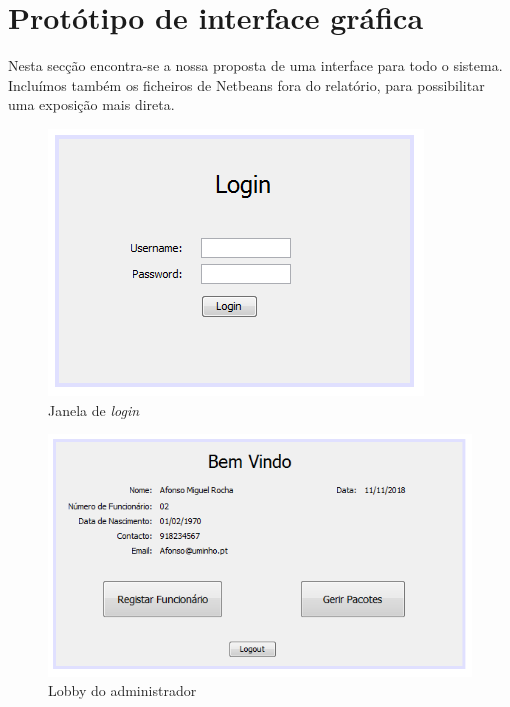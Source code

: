 \section{Protótipo de interface gráfica}

Nesta secção encontra-se a nossa proposta de uma interface para todo o sistema. Incluímos também os ficheiros de Netbeans fora do relatório, para possibilitar uma exposição mais direta.

\begin{figure}[h]
    \centering
    \includegraphics[width=\textwidth]{analise_de_requisitos/img/login.png}
    \caption{Janela de \textit{login}}
\end{figure}

\begin{figure}
    \centering
    \includegraphics[width=\textwidth]{analise_de_requisitos/img/lobby_admin.png}
    \caption{Lobby do administrador}
\end{figure}

